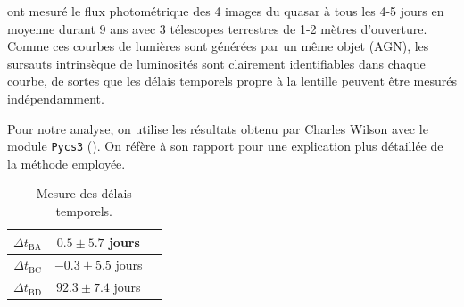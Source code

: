 \documentclass[times,10pt,twocolumn]{article}
\begin{document}
\citet{Tewes2013} ont mesuré le flux photométrique des 4 images du quasar à 
tous les 4-5 jours en moyenne durant 9 ans avec 3 télescopes terrestres de 
1-2 mètres d'ouverture. Comme ces courbes de lumières sont générées par un même objet (AGN), 
les sursauts intrinsèque de luminosités sont clairement identifiables dans chaque courbe, de 
sortes que les délais temporels propre à la lentille peuvent être mesurés indépendamment. 

Pour notre analyse, on utilise les résultats obtenu par Charles Wilson avec le 
module \texttt{Pycs3} (\citet{Millon2020}). On réfère à son rapport pour une explication 
plus détaillée de la méthode employée.

\begin{table}[H]
        \centering
        \begin{tabular}{ccc}
                \toprule
                $\Delta t_{\mathrm{BA}}$ & $0.5 \pm 5.7$ jours \\\midrule
                $\Delta t_{\mathrm{BC}}$ & $-0.3 \pm 5.5$ jours \\\midrule 
                $\Delta t_{\mathrm{BD}}$ & $92.3 \pm 7.4$ jours \\\bottomrule
        \end{tabular}
        \caption{Mesure des délais temporels.}
        \label{tab:TimeDelay}
\end{table}

\end{document}
